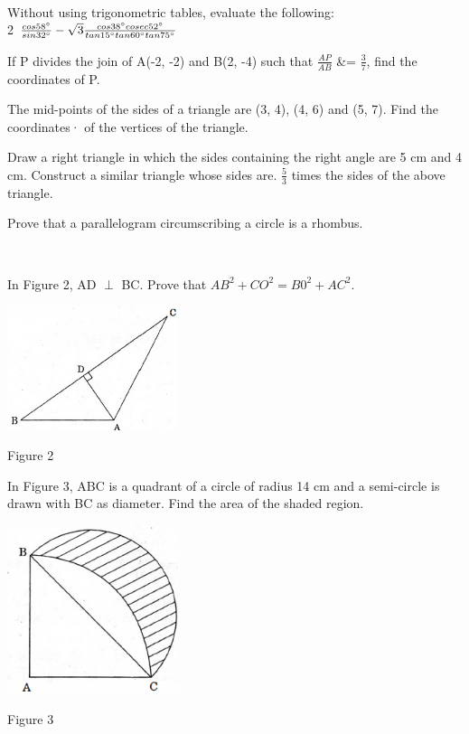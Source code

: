 \documentclass[journal,12pt,twocolumn]{IEEEtran}
\begin{document}
\begin{enumerate}
{{    \caption{\textbf{}\\ }
                        }
Without using trigonometric tables, evaluate the following:\\
2 $\frac{cos58\degree }{sin32\degree} - \sqrt{3}\frac{cos38\degree cosec52\degree}{tan15\degree tan60\degree tan75\degree}$\\
\item If P divides the join of A(-2, -2) and B(2, -4) such that $\frac{AP}{AB}$ &= $\frac{3}{7}$, find the coordinates of P.\\
\item The mid-points of the sides of a triangle are (3, 4), (4, 6) and (5, 7). Find the coordinates· of the vertices of the triangle.\\
\item Draw a right triangle in which the sides containing the right angle are 5 cm and 4 cm. Construct a similar triangle whose sides are. $\frac{5}{3}$ times the sides of the above triangle.\\
\item Prove that a parallelogram circumscribing a circle is a rhombus.

{\centering

    \caption{\textbf{}\\ }
                        }
In Figure 2, AD $\perp$ BC. Prove that $AB^2 + CO^2 = B0^2 + AC^2$.
{\centering
    \includegraphics[width=5cm, center]{4.png}
    \caption{Figure 2 \\ }
    \label{Some label}}
\item In Figure 3, ABC is a quadrant of a circle of radius 14 cm and a semi-circle is drawn with BC as diameter. Find the area of the shaded region.

{\centering
    \includegraphics[width=5cm, center]{5.png}
    \caption{Figure 3 \\ }
    \label{Some label}}
    
}
\end{enumerate}
\end{document}
